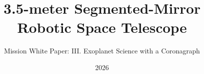 \title{3.5-meter Segmented-Mirror Robotic Space Telescope}
\newcommand{\wpvolumelabel}{III}
\newcommand{\wpvolumetitle}{Exoplanet Science with a Coronagraph}
\subtitle{Mission White Paper: \wpvolumelabel. \wpvolumetitle}
\newcommand{\wpauthors}{Juhan Kim, Yong-Woo Kang, Sang Hyun Lee, Jeong-Yeol Han, Sungwook E. Hong, Bongkon Moon, Donguk Song, Juhyung Kang, Myeong-Gu Park, Sang Chul Kim, Chung-Uk Lee, Sangmo Tony Sohn, Arman Shafieloo, David Parkinson, Hong Soo Park, Dohyeong Kim, Chan Park, Jungjoo Sohn, Young-Beom Jeon, Jong-Hak Woo, Hyung Mok Lee, Hong Bae Ann, Myungkook James Jee, Mansoo Choi, Changbom Park}
\date{2026}
\newcommand{\wpchapteroffset}{1}
\newcommand{\MakeVolumeBody}{%
  \definecolor{Blue1}{HTML}{86A67C}%
  \definecolor{Blue2}{HTML}{5E8158}%
  \definecolor{Blue3}{HTML}{45613F}%
  }
